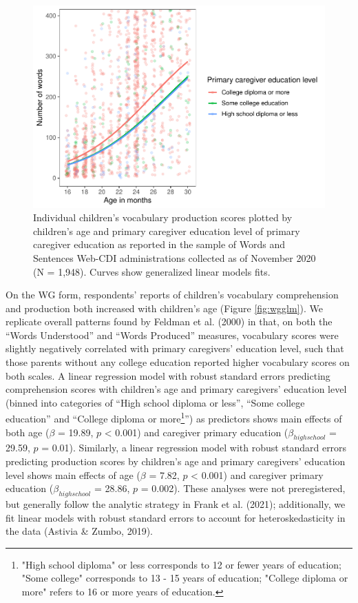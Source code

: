 \documentclass[
  english,
  ,man,floatsintext]{apa6}
\begin{document}
\begin{figure}
\centering
\includegraphics{webcdi_paper_files/figure-latex/wsglm-1.pdf}
\caption{\label{fig:wsglm}Individual children's vocabulary production scores plotted by children's age and primary caregiver education level of primary caregiver education as reported in the sample of Words and Sentences Web-CDI administrations collected as of November 2020 (N = 1,948). Curves show generalized linear models fits.}
\end{figure}

On the WG form, respondents' reports of children's vocabulary comprehension and production both increased with children's age (Figure \ref{fig:wgglm}). We replicate overall patterns found by Feldman et al. (2000) in that, on both the \enquote{Words Understood} and \enquote{Words Produced} measures, vocabulary scores were slightly negatively correlated with primary caregivers' education level, such that those parents without any college education reported higher vocabulary scores on both scales. A linear regression model with robust standard errors predicting comprehension scores with children's age and primary caregivers' education level (binned into categories of \enquote{High school diploma or less}, \enquote{Some college education} and \enquote{College diploma or more\footnote{"High school diploma" or less corresponds to 12 or fewer years of education; "Some college" corresponds to 13 - 15 years of education; "College diploma or more" refers to 16 or more years of education.}}) as predictors shows main effects of both age (\(\beta\) = 19.89, \(p\) \textless{} 0.001) and caregiver primary education (\(\beta_{high school}\) = 29.59, \(p\) = 0.01). Similarly, a linear regression model with robust standard errors predicting production scores by children's age and primary caregivers' education level shows main effects of age (\(\beta\) = 7.82, \(p\) \textless{} 0.001) and caregiver primary education (\(\beta_{high school}\) = 28.86, \(p\) = 0.002). These analyses were not preregistered, but generally follow the analytic strategy in Frank et al. (2021); additionally, we fit linear models with robust standard errors to account for heteroskedasticity in the data (Astivia \& Zumbo, 2019).
\end{document}
